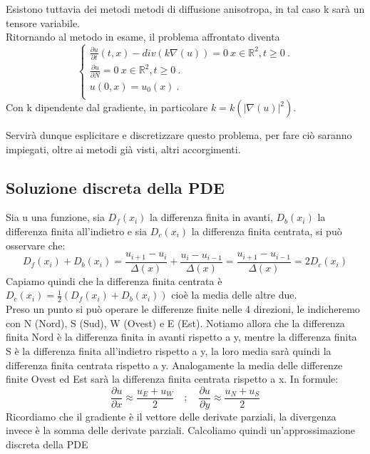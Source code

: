 Esistono tuttavia dei metodi metodi di diffusione anisotropa, in tal caso k sarà un tensore variabile.\\
\vspace{1em}
Ritornando al metodo in esame, il problema affrontato diventa\\
$$
\begin{cases}
\frac{\partial u}{\partial t}(t,x)-div(k\nabla(u)) = 0 \ x \in \mathbb R^2, t\ge 0 \ .\\ 
\frac{\partial u}{\partial N}=0 \ x \in \mathbb R^2, t\ge 0 \ .\\ 
u(0,x) = u_0(x)\ . \\
\end{cases}
$$
Con k dipendente dal gradiente, in particolare $k=k(|\nabla(u)|^2)$.

Servirà dunque esplicitare e discretizzare questo problema, per fare ciò saranno impiegati, oltre ai metodi già visti, altri accorgimenti.\\

\newpage
\subsection{Soluzione discreta della PDE}
Sia u una funzione, sia $D_f(x_i)$ la differenza finita in avanti, $D_b(x_i)$ la differenza finita all'indietro e sia $D_c(x_i)$ la differenza finita centrata, si può osservare che:
$$
D_f(x_i)+D_b(x_i)= \frac{u_{i+1} - u_{i}}{\Delta(x)} + \frac{u_{i} - u_{i-1}}{\Delta(x)} = \frac{u_{i+1} - u_{i-1}}{\Delta(x)} = 2D_c(x_i)
$$
Capiamo quindi che la differenza finita centrata è $D_c(x_i)=\frac{1}{2}(D_f(x_i)+D_b(x_i))$ cioè la media delle altre due.\\ Preso un punto si può operare le differenze finite nelle 4 direzioni, le indicheremo con N (Nord), S (Sud), W (Ovest) e E (Est). Notiamo allora che la differenza finita Nord è la differenza finita in avanti rispetto a y, mentre la differenza finita S è la differenza finita all'indietro rispetto a y, la loro media sarà quindi la differenza finita centrata rispetto a y. Analogamente la media delle differenze finite Ovest ed Est sarà la differenza finita centrata rispetto a x. In formule:\\
$$
\frac{\partial u}{\partial x} \approx \frac{u_E+u_W}{2} \hspace{1em};\hspace{1em}
\frac{\partial u}{\partial y} \approx \frac{u_N+u_S}{2}
$$
Ricordiamo che il gradiente è il vettore delle derivate parziali, la divergenza invece è la somma delle derivate parziali.
Calcoliamo quindi un'approssimazione discreta della PDE\\


